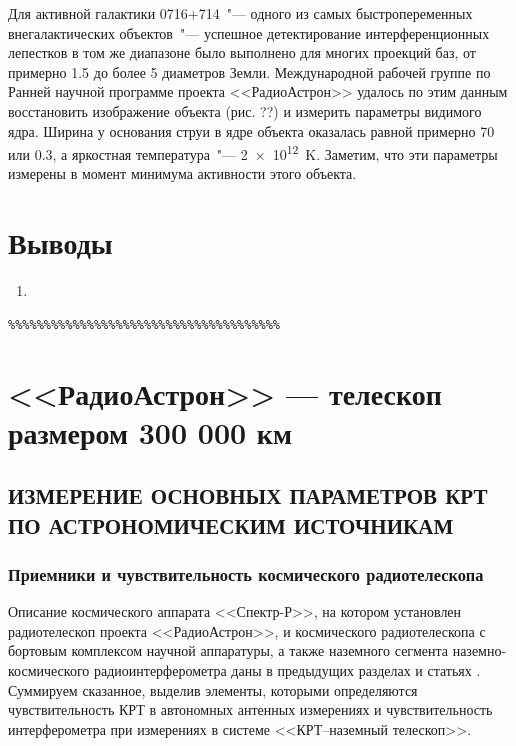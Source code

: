 Для активной галактики 0716+714~"--- одного из самых быстропеременных внегалактических объектов~"---
успешное детектирование интерференционных лепестков в том же диапазоне было выполнено для многих
проекций баз, от примерно 1.5 до более 5 диаметров Земли. Международной рабочей группе по Ранней
научной программе проекта <<РадиоАстрон>> удалось по этим данным восстановить изображение объекта
(рис. ??) и измерить параметры видимого ядра. Ширина у основания струи в ядре объекта оказалась
равной примерно \SI{70}{\uas} или \SI{0.3}{\parsec}, а яркостная температура~"---
\SI{2e12}{\kelvin}.
Заметим, что эти параметры измерены в момент минимума активности этого объекта.

\section{Выводы}

\begin{enumerate}
 \item
\end{enumerate}


\begin{verbatim}
%%%%%%%%%%%%%%%%%%%%%%%%%%%%%%%%%%%%%%
\end{verbatim}


\section{<<РадиоАстрон>> --- телескоп размером 300 000 км}

\subsection{ИЗМЕРЕНИЕ ОСНОВНЫХ ПАРАМЕТРОВ КРТ
         ПО АСТРОНОМИЧЕСКИМ ИСТОЧНИКАМ}

\subsubsection{Приемники и чувствительность космического радиотелескопа}

Описание космического аппарата <<Спектр-Р>>, на котором установлен радиотелескоп проекта
<<РадиоАстрон>>, и космического радиотелескопа с бортовым комплексом научной аппаратуры, а также
наземного сегмента наземно-космического радиоинтерферометра даны в предыдущих разделах и статьях
\cite{Khartov_2011,Alexandrov_2011a,Alexandrov_2011b}. Суммируем сказанное, выделив элементы,
которыми определяются чувствительность КРТ в автономных антенных измерениях и чувствительность
интерферометра при измерениях в системе <<КРТ--наземный телескоп>>.

